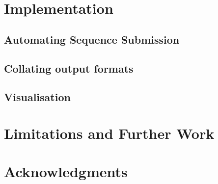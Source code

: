 \documentclass[fleqn,10pt]{SelfArx} %
\begin{document}
\section{Implementation}
\subsection{Automating Sequence Submission}
\subsection{Collating output formats}
\subsection{Visualisation}
\section{Limitations and Further Work}
\section*{Acknowledgments} %





\end{document}

